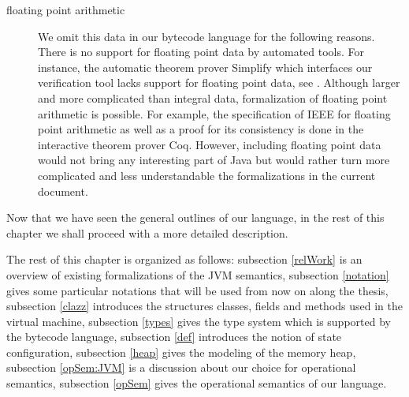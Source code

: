\begin{description}
   \item [floating point arithmetic] We omit this data in our bytecode language for the following reasons.
	 There is no support for floating point data by automated tools.  
	 For instance, the automatic theorem prover Simplify which interfaces our verification tool
	 lacks support for floating point data, see  \cite{ESC2000LNS}. 
	 Although larger and more complicated than integral data, formalization of floating point arithmetic is possible. 
	 For example, the specification of IEEE  \cite{DRT03GLF} for floating point
	 arithmetic as well as a proof for its consistency  is done in the interactive
	 theorem prover Coq. 
	 However, including floating point data would not
	 bring any interesting part of Java but would rather turn more complicated
	 and less understandable the formalizations in the current document.
	  
         
 \end{description}

 Now that we have seen the general outlines of our language,
 in the rest of this chapter we shall proceed with a more detailed description.



  
 The rest of this chapter is organized as follows:
 subsection \ref{relWork} is an overview of existing formalizations of the JVM semantics,
 subsection \ref{notation} gives some particular notations that will be used from now on along the thesis,
 subsection \ref{clazz} introduces the structures classes, fields and methods  used in the virtual machine, 
 subsection \ref{types} gives the type system which is supported by the bytecode language,
 subsection \ref{def} introduces the notion of state configuration,
 subsection \ref{heap} gives the modeling of the memory heap,
 subsection \ref{opSem:JVM} is a discussion about our choice for operational semantics,
 subsection \ref{opSem} gives the operational semantics of our language.

